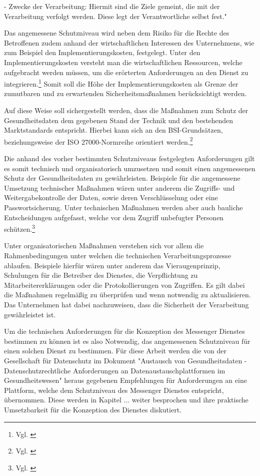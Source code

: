 - Zwecke der Verarbeitung: Hiermit sind die Ziele gemeint, die mit der Verarbeitung verfolgt werden. Diese legt der Verantwortliche selbst fest."

Das angemessene Schutzniveau wird neben dem Risiko für die Rechte des Betroffenen zudem anhand der wirtschaftlichen Interessen des Unternehmens, wie zum Beispiel den Implementierungskosten, festgelegt. Unter den Implementierungskosten versteht man die wirtschaftlichen Ressourcen, welche aufgebracht werden müssen, um die erörterten Anforderungen an den Dienst zu integrieren.\footnote{Vgl. \cite[S. 42 f.]{OrientierungshilfezumGesundheitsdatenschutz2018}} Somit soll die Höhe der Implementierungskosten als Grenze der zumutbaren und zu erwartenden Sicherheitsmaßnahmen berücksichtigt werden.

Auf diese Weise soll sichergestellt werden, dass die Maßnahmen zum Schutz der Gesundheitsdaten dem gegebenen Stand der Technik und den bestehenden Marktstandards entspricht. Hierbei kann sich an den BSI-Grundsätzen, beziehungsweise der ISO 27000-Normreihe orientiert werden.\footnote{Vgl. \cite[S. 42 f.]{OrientierungshilfezumGesundheitsdatenschutz2018}}

Die anhand des vorher bestimmten Schutzniveaus festgelegten Anforderungen gilt es somit technisch und organisatorisch umzusetzen und somit einen angemessenen Schutz der Gesundheitsdaten zu gewährleisten. Beispiele für die angemessene Umsetzung technischer Maßnahmen wären unter anderem die Zugriffs- und Weitergabekontrolle der Daten, sowie deren Verschlüsselung oder eine Passwortsicherung. Unter technischen Maßnahmen werden aber auch bauliche Entscheidungen aufgefasst, welche vor dem Zugriff unbefugter Personen schützen.\footnote{Vgl. \cite[S. 41 ff.]{OrientierungshilfezumGesundheitsdatenschutz2018}}

Unter organisatorischen Maßnahmen verstehen sich vor allem die Rahmenbedingungen unter welchen die technischen Verarbeitungsprozesse ablaufen. Beispiele hierfür wären unter anderem das Vieraugenprinzip, Schulungen für die Betreiber des Dienstes, die Verpflichtung zu Mitarbeitererklärungen oder die Protokollierungen von Zugriffen. Es gilt dabei die Maßnahmen regelmäßig zu überprüfen und wenn notwendig zu aktualisieren. Das Unternehmen hat dabei nachzuweisen, dass die Sicherheit der Verarbeitung gewährleistet ist. 

Um die technischen Anforderungen für die Konzeption des Messenger Dienstes bestimmen zu können ist es also Notwendig, das angemessenen Schutzniveau für einen solchen Dienst zu bestimmen. Für diese Arbeit werden die von der Gesellschaft für Datenschutz im Dokument "Austausch von Gesundheitsdaten -  Datenschutzrechtliche Anforderungen an Datenaustauschplattformen im Gesundheitswesen" heraus gegebenen Empfehlungen für Anforderungen an eine Plattform, welche dem Schutzniveau des Messenger Dienstes entspricht, übernommen. Diese werden in Kapitel ... weiter besprochen und ihre praktische Umsetzbarkeit für die Konzeption des Dienstes diskutiert. 


